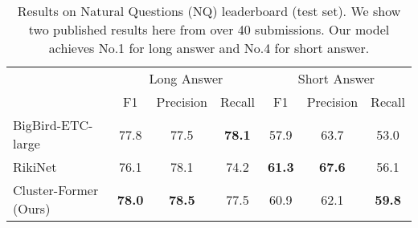 \begin{table*}
\centering
\setlength{\tabcolsep}{0.5em}
\begin{tabular}{lcccccc}
\toprule
               & \multicolumn{3}{c}{Long Answer}    & \multicolumn{3}{c}{Short Answer}   \\
               
               & F1            & Precision & Recall & F1            & Precision & Recall \\ \midrule
BigBird-ETC-large~\citep{zaheer2020big}      & 77.8          & 77.5      & \textbf{78.1}   & 57.9          & 63.7      & 53.0   \\
RikiNet~\citep{liu2020rikinet}        & 76.1          & 78.1      & 74.2   & \textbf{61.3} & \textbf{67.6}      & 56.1   \\ \midrule
Cluster-Former (Ours) & \textbf{78.0} & \textbf{78.5}      & 77.5   & 60.9          & 62.1      & \textbf{59.8}  \\
\bottomrule
\end{tabular}
\caption{Results on Natural Questions (NQ) leaderboard (test set). We show two published results here from over 40 submissions. Our model achieves No.1 for long answer and No.4 for short answer. }
\label{tbl:nq_results}
\end{table*} 
